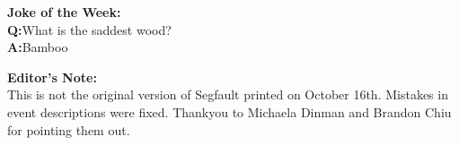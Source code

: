\documentclass[9pt]{extarticle} %
\begin{document}
\begin{minipage}[t]{.35\linewidth}
\begin{mdframed}[style=sidebar,frametitle={}]
\textbf{Joke of the Week:\\}
\textbf{Q:}What is the saddest wood? \\
\textbf{A:}Bamboo \\ 

\end{mdframed}
\vspace{10px}
\begin{mdframed}[style=sidebar,frametitle={}] %
\textbf{Editor's Note:} \\
This is not the original version of Segfault printed on October 16th. Mistakes in event descriptions were fixed. Thankyou to Michaela Dinman and Brandon Chiu for pointing them out. 
\end{mdframed}
\end{minipage}\hfill %
%
%
\end{document}
